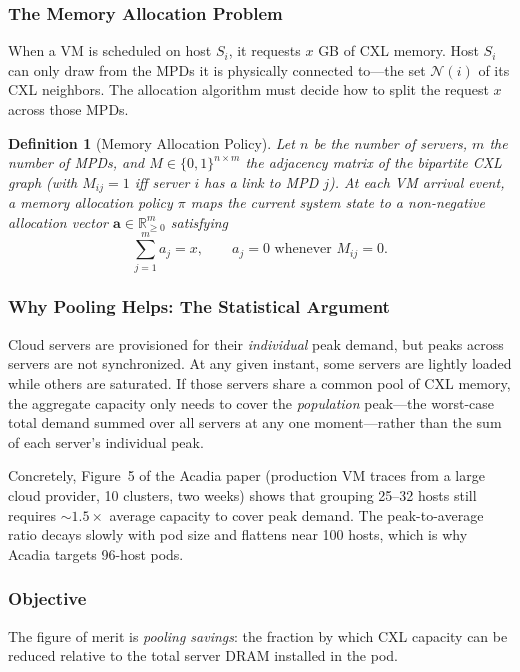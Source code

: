 \documentclass[11pt]{article}
\newtheorem{definition}{Definition}
\begin{document}
\subsubsection*{The Memory Allocation Problem}

When a VM is scheduled on host $S_i$, it requests $x$ GB of CXL memory.
Host $S_i$ can only draw from the MPDs it is physically connected to---the
set $\mathcal{N}(i)$ of its CXL neighbors.  The allocation algorithm must
decide how to split the request $x$ across those MPDs.

\begin{definition}[Memory Allocation Policy]
Let $n$ be the number of servers, $m$ the number of MPDs, and $M \in \{0,1\}^{n
\times m}$ the adjacency matrix of the bipartite CXL graph (with $M_{ij} = 1$
iff server $i$ has a link to MPD $j$).  At each VM arrival event, a
\emph{memory allocation policy} $\pi$ maps the current system state to a
non-negative allocation vector $\mathbf{a} \in \mathbb{R}_{\ge 0}^{m}$
satisfying
\[
    \sum_{j=1}^{m} a_j = x,
    \qquad
    a_j = 0 \text{ whenever } M_{ij} = 0.
\]
\end{definition}

\subsubsection*{Why Pooling Helps: The Statistical Argument}

Cloud servers are provisioned for their \emph{individual} peak demand, but
peaks across servers are not synchronized.  At any given instant, some servers
are lightly loaded while others are saturated.  If those servers share a common
pool of CXL memory, the aggregate capacity only needs to cover the
\emph{population} peak---the worst-case total demand summed over all servers at
any one moment---rather than the sum of each server's individual peak.

Concretely, Figure~5 of the Acadia paper (production VM traces from a large
cloud provider, 10 clusters, two weeks) shows that grouping 25--32 hosts still
requires $\sim 1.5\times$ average capacity to cover peak demand.  The
peak-to-average ratio decays slowly with pod size and flattens near 100 hosts,
which is why Acadia targets 96-host pods.

\subsubsection*{Objective}

The figure of merit is \emph{pooling savings}: the fraction by which CXL
capacity can be reduced relative to the total server DRAM installed in the pod.
\end{document}
